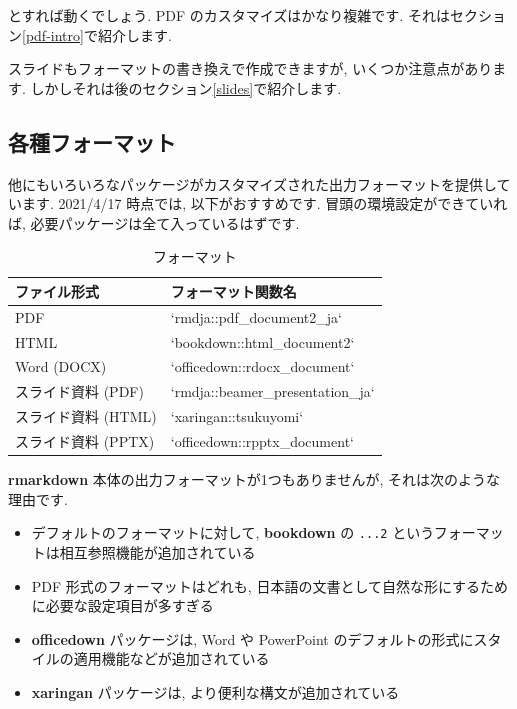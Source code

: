 \documentclass[
]{ltjsarticle}
\providecommand{\tightlist}{%
  \setlength{\itemsep}{0pt}\setlength{\parskip}{0pt}}
\begin{document}
とすれば動くでしょう. PDF のカスタマイズはかなり複雑です. それはセクション\ref{pdf-intro}で紹介します.

スライドもフォーマットの書き換えで作成できますが, いくつか注意点があります. しかしそれは後のセクション\ref{slides}で紹介します.

\hypertarget{ux5404ux7a2eux30d5ux30a9ux30fcux30deux30c3ux30c8}{%
\subsection{各種フォーマット}\label{ux5404ux7a2eux30d5ux30a9ux30fcux30deux30c3ux30c8}}

他にもいろいろなパッケージがカスタマイズされた出力フォーマットを提供しています. 2021/4/17 時点では, 以下がおすすめです. 冒頭の環境設定ができていれば, 必要パッケージは全て入っているはずです.

\begin{table}

\caption{\label{tab:format-tab}フォーマット}
\centering
\begin{tabular}[t]{ll}
\toprule
ファイル形式 & フォーマット関数名\\
\midrule
PDF & `rmdja::pdf\_document2\_ja`\\
HTML & `bookdown::html\_document2`\\
Word (DOCX) & `officedown::rdocx\_document`\\
スライド資料 (PDF) & `rmdja::beamer\_presentation\_ja`\\
スライド資料 (HTML) & `xaringan::tsukuyomi`\\
\addlinespace
スライド資料 (PPTX) & `officedown::rpptx\_document`\\
\bottomrule
\end{tabular}
\end{table}

\textbf{rmarkdown} 本体の出力フォーマットが1つもありませんが, それは次のような理由です.

\begin{itemize}
\tightlist
\item
  デフォルトのフォーマットに対して, \textbf{bookdown} の \texttt{...2} というフォーマットは相互参照機能が追加されている
\item
  PDF 形式のフォーマットはどれも, 日本語の文書として自然な形にするために必要な設定項目が多すぎる
\item
  \textbf{officedown} パッケージは, Word や PowerPoint のデフォルトの形式にスタイルの適用機能などが追加されている
\item
  \textbf{xaringan} パッケージは, より便利な構文が追加されている
\end{itemize}
\end{document}
